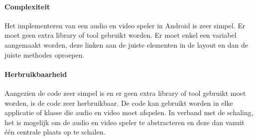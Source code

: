 \paragraph{Complexiteit}
Het implementeren van een audio en video speler in Android is zeer simpel. 
Er moet geen extra library of tool gebruikt worden. Er moet enkel een variabel aangemaakt worden, 
deze linken aan de juiste elementen in de layout en dan de juiste methodes oproepen.

\paragraph{Herbruikbaarheid}
Aangezien de code zeer simpel is en er geen extra library of tool gebruikt moet worden,
is de code zeer herbruikbaar. De code kan gebruikt worden in elke applicatie of klasse die audio en video
moet afspelen. In verband met de schaling, het is mogelijk om de audio en video speler te abstracteren 
en deze dan vanuit één centrale plaats op te schalen. 

